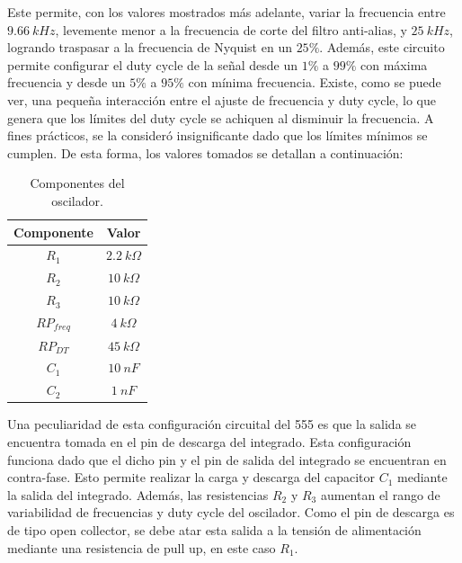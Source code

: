 Este permite, con los valores mostrados más adelante, variar la frecuencia entre $9.66 \ kHz$, levemente menor a la frecuencia de corte del filtro anti-alias, y $25 \ kHz$, logrando traspasar a la frecuencia de Nyquist en un $25\%$. Además, este circuito permite configurar el duty cycle de la señal desde un $1\%$ a $99\%$ con máxima frecuencia y desde un $5\%$ a $95\%$ con mínima frecuencia. Existe, como se puede ver, una pequeña interacción entre el ajuste de frecuencia y duty cycle, lo que genera que los límites del duty cycle se achiquen al disminuir la frecuencia. A fines prácticos, se la consideró insignificante dado que los límites mínimos se cumplen. De esta forma, los valores tomados se detallan a continuación:
\begin{table}[H]
\centering
\begin{tabular}{cc}
\hline
Componente & Valor \\ \hline
$R_1$ & $2.2 \ k\Omega$ \\
$R_2$ & $10 \ k\Omega$ \\
$R_3$ & $10 \ k\Omega$  \\
$RP_{freq}$ & $4 \ k\Omega$  \\
$RP_{DT}$ & $45 \ k\Omega$  \\
$C_1$ & $10 \ nF$  \\
$C_2$ & $1 \ nF$\\ \hline
\end{tabular}
\caption{Componentes del oscilador.}
\end{table}

Una peculiaridad de esta configuración circuital del 555 es que la salida se encuentra tomada en el pin de descarga del integrado. Esta configuración funciona dado que el dicho pin y el pin de salida del integrado se encuentran en contra-fase. Esto permite realizar la carga y descarga del capacitor $C_1$ mediante la salida del integrado. Además, las resistencias $R_2$ y $R_3$ aumentan el rango de variabilidad de frecuencias y duty cycle del oscilador. Como el pin de descarga es de tipo open collector, se debe atar esta salida a la tensión de alimentación mediante una resistencia de pull up, en este caso $R_1$.

